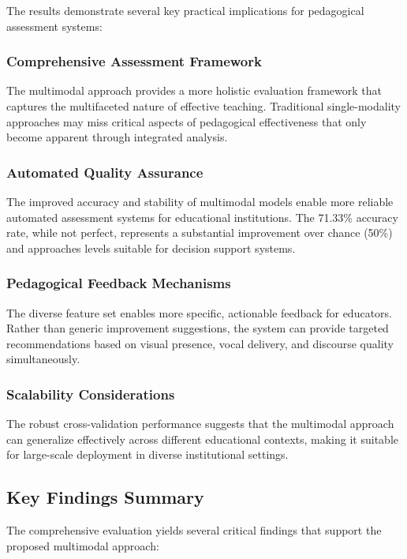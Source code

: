 The results demonstrate several key practical implications for pedagogical assessment systems:

\subsubsection{Comprehensive Assessment Framework}
The multimodal approach provides a more holistic evaluation framework that captures the multifaceted nature of effective teaching. Traditional single-modality approaches may miss critical aspects of pedagogical effectiveness that only become apparent through integrated analysis.

\subsubsection{Automated Quality Assurance}
The improved accuracy and stability of multimodal models enable more reliable automated assessment systems for educational institutions. The 71.33\% accuracy rate, while not perfect, represents a substantial improvement over chance (50\%) and approaches levels suitable for decision support systems.

\subsubsection{Pedagogical Feedback Mechanisms}
The diverse feature set enables more specific, actionable feedback for educators. Rather than generic improvement suggestions, the system can provide targeted recommendations based on visual presence, vocal delivery, and discourse quality simultaneously.

\subsubsection{Scalability Considerations}
The robust cross-validation performance suggests that the multimodal approach can generalize effectively across different educational contexts, making it suitable for large-scale deployment in diverse institutional settings.

\subsection{Key Findings Summary}

The comprehensive evaluation yields several critical findings that support the proposed multimodal approach:

